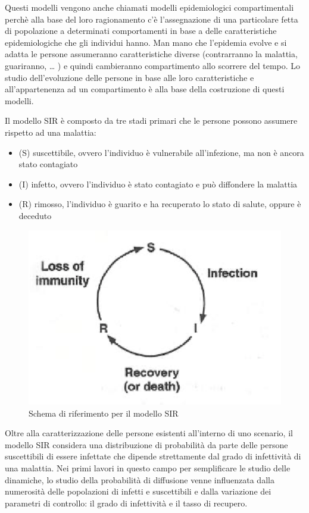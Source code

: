Questi modelli vengono anche chiamati modelli epidemiologici compartimentali \cite{ScienceConnectedAge} perchè alla base del loro ragionamento c'è l'assegnazione di una particolare fetta di popolazione a determinati comportamenti in base a delle caratteristiche epidemiologiche che gli individui hanno. Man mano che l'epidemia evolve e si adatta le persone assumeranno caratteristiche diverse (contrarranno la malattia, guariranno, … ) e quindi cambieranno compartimento allo scorrere del tempo. Lo studio dell'evoluzione delle persone in base alle loro caratteristiche e all'appartenenza ad un compartimento è alla base della costruzione di questi modelli.

Il modello SIR è composto da tre stadi primari che le persone possono assumere rispetto ad una malattia: 
\begin{itemize}
    \item (S) suscettibile, ovvero l'individuo è vulnerabile all'infezione, ma non è ancora stato contagiato
    \item (I) infetto, ovvero l'individuo è stato contagiato e può diffondere la malattia
    \item (R) rimosso, l'individuo è guarito e ha recuperato lo stato di salute, oppure è deceduto
\end{itemize}

\begin{figure}[H]
    \centering
    \includegraphics[width=.5\textwidth]{resources/sir_circle.png}
    \caption{Schema di riferimento per il modello SIR} 
\end{figure}

Oltre alla caratterizzazione delle persone esistenti all'interno di uno scenario, il modello SIR considera una distribuzione di probabilità da parte delle persone suscettibili di essere infettate che dipende strettamente dal grado di infettività di una malattia. Nei primi lavori in questo campo per semplificare le studio delle dinamiche, lo studio della probabilità di diffusione venne influenzata dalla numerosità delle popolazioni di infetti e suscettibili e dalla variazione dei parametri di controllo: il grado di infettività e il tasso di recupero.

